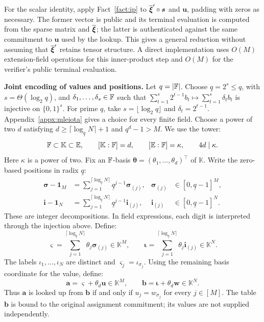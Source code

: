 For the scalar identity, apply Fact~\ref{fact:ip} to
\(\overline{\bm\xi}'\circ\bm s\) and \(\bm u\), padding with zeros
as necessary. The former vector is public and its terminal
evaluation is computed from the sparse matrix and
\(\overline{\bm\xi}\); the latter is authenticated against the same
commitment to \(\bm u\) used by the lookup.
This gives a general reduction without assuming that
\(\overline{\bm\xi}'\) retains tensor structure.
A direct implementation uses \(O(M)\) extension-field operations
for this inner-product step and \(O(M)\) for the verifier's
public terminal evaluation.

\smallskip\noindent\textbf{Joint encoding of values and positions.}
Let \(q=|{\mathbb{F}}|\). Choose \(\underline q=2^s\leq q\), with
\(s=\Theta(\log_2q)\), and
\(\delta_1,\ldots,\delta_s\in{\mathbb{F}}\) such that
\(\sum_{t=1}^s2^{t-1}b_t\mapsto\sum_{t=1}^s\delta_tb_t\)
is injective on \(\{0,1\}^s\).
For prime \(q\), take \(s=\lfloor\log_2q\rfloor\) and
\(\delta_t=2^{t-1}\).
Appendix~\ref{appx:mleiota} gives a choice for every finite field.
Choose a power of two \(d\) satisfying
\(d\geq\lceil\log_{\underline q}N\rceil+1\) and \(q^d-1>M\).
We use the tower:
\[
    {\mathbb{F}}\subset\mathbb K\subset\mathbb{E},
    \qquad
    [\mathbb K:{\mathbb{F}}]=d,
    \qquad
    [\mathbb{E}:{\mathbb{F}}]=\kappa,
    \qquad
    4d\mid\kappa.
\]
Here \(\kappa\) is a power of two.
Fix an \({\mathbb{F}}\)-basis
\(\bm\theta=(\theta_1,\ldots,\theta_d)^\top\) of \(\mathbb K\).
Write the zero-based positions in radix \(\underline q\):
\[
\begin{aligned}
    \bm\sigma-\bm1_M
      &=\sum_{j=1}^{\lceil\log_{\underline q}N\rceil}
          \underline q^{j-1}\bm\sigma_{(j)},&
    \bm\sigma_{(j)}&\in[0,\underline q-1]^M,\\
    \bm i-\bm1_N
      &=\sum_{j=1}^{\lceil\log_{\underline q}N\rceil}
          \underline q^{j-1}\bm i_{(j)},&
    \bm i_{(j)}&\in[0,\underline q-1]^N.
\end{aligned}
\]
These are integer decompositions. In field expressions, each digit
is interpreted through the injection above. Define:
\[
    \bm\varsigma
      =\sum_{j=1}^{\lceil\log_{\underline q}N\rceil}
          \theta_j\bm\sigma_{(j)}\in\mathbb K^M,
    \qquad
    \bm\iota
      =\sum_{j=1}^{\lceil\log_{\underline q}N\rceil}
          \theta_j\bm i_{(j)}\in\mathbb K^N.
\]
The labels \(\iota_1,\ldots,\iota_N\) are distinct and
\(\varsigma_j=\iota_{\sigma_j}\). Using the remaining basis
coordinate for the value, define:
\[
    \bm a=\bm\varsigma+\theta_d\bm u\in\mathbb K^M,
    \qquad
    \bm b=\bm\iota+\theta_d\bm w\in\mathbb K^N.
\]
Thus \(\bm a\) is looked up from \(\bm b\) if and only if
\(u_j=w_{\sigma_j}\) for every \(j\in[M]\).
The table \(\bm b\) is bound to the original assignment commitment;
its values are not supplied independently.

